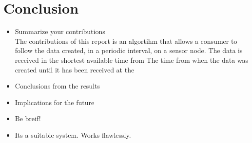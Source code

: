 \section{Conclusion}

\begin{itemize}
\item Summarize your contributions\\
The contributions of this report is an algortihm that allows a consumer to follow the data created, in a periodic interval, on a sensor node. 
The data is received in the shortest available time from 
The time from when the data was created until it has been received at the 

\item Conclusions from the results
\item Implications for the future 
\item Be breif!

\item Its a suitable system. Works flawlessly.
\end{itemize}

